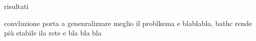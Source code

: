 risultati



convluzione porta a genenralizzare meglio il problkema e blablabla, bathc rende più stabile ila rete e bla bla bla